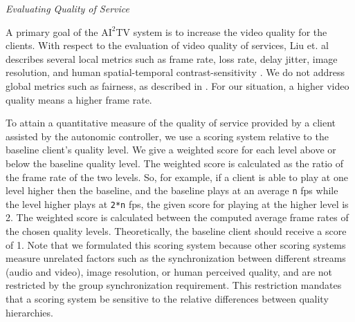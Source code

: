 \documentclass{sig-alternate}
\begin{document}



\textit{Evaluating Quality of Service} 

A primary goal of the $\mathrm{AI}^2$TV system is to increase the
video quality for the clients.  With respect to the evaluation of
video quality of services, Liu et. al describes several local metrics
such as frame rate, loss rate, delay jitter, image resolution, and
human spatial-temporal contrast-sensitivity \cite{LIU}.  We do not
address global metrics such as fairness, as described in \cite{LIU}.
For our situation, a higher video quality means a higher frame rate.

To attain a quantitative measure of the quality of service provided by
a client assisted by the autonomic controller, we use a scoring system
relative to the baseline client's quality level.  We give a weighted
score for each level above or below the baseline quality level.  The
weighted score is calculated as the ratio of the frame rate of the two
levels.  So, for example, if a client is able to play at one level
higher then the baseline, and the baseline plays at an average
\texttt{n} fps while the level higher plays at \texttt{2*n} fps, the
given score for playing at the higher level is 2.  The weighted score
is calculated between the computed average frame rates of the chosen
quality levels.  Theoretically, the baseline client should receive a
score of 1.  Note that we formulated this scoring system because other
scoring systems \cite{BAQAI,CORTE,CONWAY2000} measure unrelated
factors such as the synchronization between different streams (audio
and video), image resolution, or human perceived quality, and are not
restricted by the group synchronization requirement.  This restriction
mandates that a scoring system be sensitive to the relative
differences between quality hierarchies.
\end{document}
